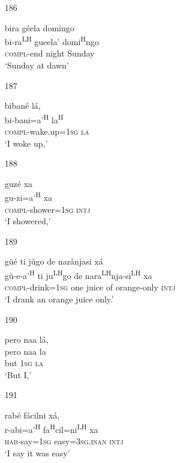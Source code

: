 \begin{itemize}
\item[186]

\glll  bira g\'{e}ela dom\'{i}ngo \\
 bi-ra\textsuperscript{LH} gueela' domi\textsuperscript{H}ngo  \\
\textsc{compl}-end night Sunday \\
\glt `Sunday at dawn'
 


\item[187]
 
\glll biban\'{e} l\'{a}, \\
bi-bani=a'\textsuperscript{H} la\textsuperscript{H} \\
\textsc{compl}-wake.up=\textsc{1sg} \textsc{la} \\
\glt `I woke up,' 



\item [188]

\glll guz\'{e} xa \\
gu-zi=a'\textsuperscript{H} xa \\
\textsc{compl}-shower=\textsc{1sg} \textsc{intj} \\
\glt `I showered,' 


\item [189]

\glll g\"{u}\'{e} ti j\v{u}go de nar\v{a}njasi x\'{a} \\
g\"{u}-e-a'\textsuperscript{H} ti ju\textsuperscript{LH}go de nara\textsuperscript{LH}nja-si\textsuperscript{LH} xa \\
\textsc{compl}-drink=\textsc{1sg} one juice of orange-only \textsc{intj} \\
\glt `I drank an orange juice only.'



\item[190]
 
\glll   pero naa l\'{a},  \\
 pero naa la \\
 but \textsc{1sg} \textsc{la} \\
\glt `But I,'
 


\item[191]
 
\glll   rab\'{e} f\'{a}cilni x\'{a},  \\
 r-abi=a'\textsuperscript{H} fa\textsuperscript{H}cil=ni\textsuperscript{LH} xa \\
\textsc{hab}-say=\textsc{1sg} easy=\textsc{3sg.inan} \textsc{intj} \\
\glt `I say it was easy'
 



\end{itemize}

